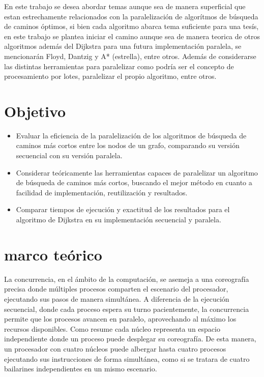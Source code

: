 En este trabajo se desea abordar temas aunque sea de manera superficial que estan estrechamente relacionados con la paralelización de algorítmos de búsqueda de caminos óptimos, si bien cada algoritmo abarca tema suficiente para una tesís, en este trabajo se plantea iniciar el camino aunque sea de manera teorica de otros algoritmos además del Dijkstra para una futura implementación paralela, se mencionarán  Floyd, Dantzig y A* (estrella), entre otros. Además de considerarse las distintas herramientas para paralelizar como podría ser el concepto de procesamiento por lotes, paralelizar el propio algoritmo, entre otros. 

\section{Objetivo}

\begin{itemize}
  \item Evaluar la eficiencia de la paralelización de los algoritmos de búsqueda de caminos más cortos entre los nodos de un grafo, comparando su versión secuencial con su versión paralela.
  \item Considerar teóricamente las herramientas capaces de paralelizar un algoritmo de búsqueda de caminos más cortos, buscando el mejor método en cuanto a facilidad de implementación, reutilización y resultados.
  \item Comparar tiempos de ejecución y exactitud de los resultados para el algoritmo de Dijkstra en su implementación secuencial y paralela.
\end{itemize}

\section{marco teórico}

La concurrencia, en el ámbito de la computación, se asemeja a una coreografía precisa donde múltiples procesos comparten el escenario del procesador, ejecutando sus pasos de manera simultánea. A diferencia de la ejecución secuencial, donde cada proceso espera su turno pacientemente, la concurrencia permite que los procesos avancen en paralelo, aprovechando al máximo los recursos disponibles. Como resume \cite{oscar} cada núcleo representa un espacio independiente donde un proceso puede desplegar su coreografía. De esta manera, un procesador con cuatro núcleos puede albergar hasta cuatro procesos ejecutando sus instrucciones de forma simultánea, como si se tratara de cuatro bailarines independientes en un mismo escenario.


